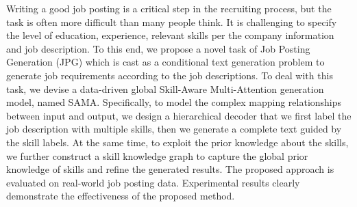 Writing a good job posting is a critical step in the recruiting process, but the task is often more difficult than many people think. It is challenging to specify the level of education, experience, relevant skills per the company information and job description. To this end, we propose a novel task of Job Posting Generation (JPG) which is cast as a conditional text generation problem to generate job requirements according to the job descriptions. To deal with this task, we devise a data-driven global Skill-Aware Multi-Attention generation model, named SAMA. Specifically, to model the complex mapping relationships between input and output, we design a hierarchical decoder that we first label the job description with multiple skills, then we generate a complete text guided by the skill labels. At the same time, to exploit the prior knowledge about the skills, we further construct a skill knowledge graph to capture the global prior knowledge of skills and refine the generated results. The proposed approach is evaluated on real-world job posting data. Experimental results clearly demonstrate the effectiveness of the proposed method.
